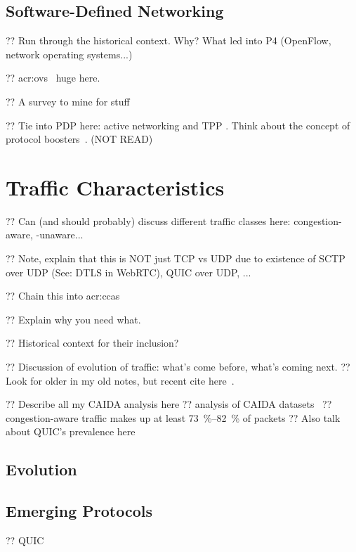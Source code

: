 \subsection{Software-Defined Networking}

?? Run through the historical context. Why? What led into P4 (OpenFlow, network operating systems...)

?? \gls{acr:ovs}~\parencite{DBLP:conf/nsdi/PfaffPKJZRGWSSA15} huge here.

?? A survey to mine for stuff~\parencite{DBLP:journals/comsur/NunesMNOT14}

?? Tie into PDP here: active networking and TPP . Think about the concept of protocol boosters~\parencite{DBLP:journals/jsac/FeldmeierMSBMR98}. (NOT READ)

\section{Traffic Characteristics}

?? Can (and should probably) discuss different traffic classes here: congestion-aware, -unaware...

?? Note, explain that this is NOT just TCP vs UDP due to existence of SCTP over UDP (See: DTLS in WebRTC), QUIC over UDP, ...

?? Chain this into \glspl{acr:cca}

?? Explain why you need what.

?? Historical context for their inclusion?

?? Discussion of evolution of traffic: what's come before, what's coming next.
?? Look for older in my old notes, but recent cite here~\parencite{DBLP:conf/anrw/BauerJHBC21}.

?? Describe all my CAIDA analysis here
?? analysis of CAIDA datasets~\parencite{caida-2018-passive}
?? congestion-aware traffic makes up at least \qtyrange{73}{82}{\percent} of packets
?? Also talk about QUIC's prevalence here

\subsection{Evolution}

\subsection{Emerging Protocols}

?? QUIC~\parencite{DBLP:conf/sigcomm/LangleyRWVKZYKS17}

